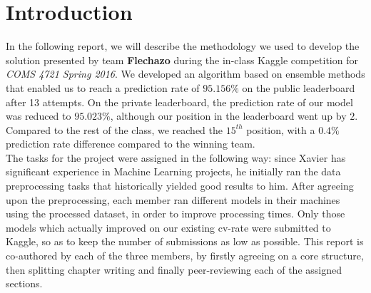 
\chapter{Introduction}\label{ch:introduction}
In the following report, we will describe the methodology we used to develop the solution presented by team \textbf{Flechazo} during the in-class Kaggle competition for \textit{COMS 4721 Spring 2016}.
We developed an algorithm based on ensemble methods that enabled us to reach a prediction rate of $95.156\%$ on the public leaderboard after 13 attempts. On the private leaderboard, the prediction rate of our model was reduced to $95.023\%$, although our position in the leaderboard went up by $2$. Compared to the rest of the class, we reached the $15^{th}$ position, with a $0.4\%$ prediction rate difference compared to the winning team.\vspace{.5cm}\\
The tasks for the project were assigned in the following way: since Xavier has significant experience in Machine Learning projects, he initially ran the data preprocessing tasks that historically yielded good results to him. After agreeing upon the preprocessing, each member ran different models in their machines using the processed dataset, in order to improve processing times. Only those models which actually improved on our existing cv-rate were submitted to Kaggle, so as to keep the number of submissions as low as possible. This report is co-authored by each of the three members, by firstly agreeing on a core structure, then splitting chapter writing and finally peer-reviewing each of the assigned sections.